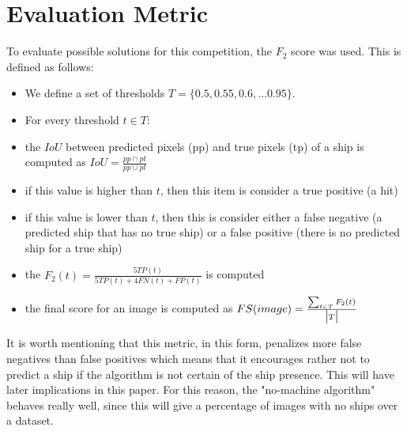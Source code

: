 \section{Evaluation Metric}
To evaluate possible solutions for this competition, the $F_2$ score was used. This is defined as follows:
\begin{itemize}
	\item We define a set of thresholds $T = \{0.5, 0.55, 0.6, \dots 0.95\}$.
	\item For every threshold $t \in T$:
	\item the $IoU$ between predicted pixels (pp) and true pixels (tp) of a ship is computed as $IoU = \frac{pp \cap pt}{pp \cup pt}$
	\item if this value is higher than $t$, then this item is consider a true positive (a hit)
	\item if this value is lower than $t$, then this is consider either a false negative (a predicted ship that has no true ship) or a false positive (there is no predicted ship for a true ship)
	\item the $F_2(t) =\frac{5TP(t)}{5TP(t) + 4FN(t) + FP(t)}$ is computed
	\item the final score for an image is computed as $FS(image) = \frac{\sum_{t \in T} F_2(t)}{\big{|}T\big{|}}$
\end{itemize}

It is worth mentioning that this metric, in this form, penalizes more false negatives than false positives which means that it encourages rather not to predict a ship if the algorithm is not certain of the ship presence. This will have later implications in this paper. For this reason, the "no-machine algorithm" behaves really well, since this will give a percentage of images with no ships over a dataset.